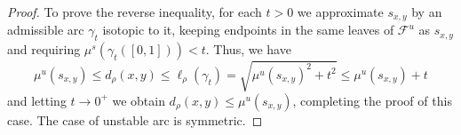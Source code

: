 \documentclass[10pt,a4paper]{amsart}
\newcommand{\mc}{\mathcal}
\begin{document}
\begin{proof}
To prove the reverse inequality, for each $t>0$
we approximate $s_{x,y}$ by an admissible arc $\gamma_t$ isotopic to it, keeping endpoints in the same leaves of $\mc{F}^u$ as $s_{x,y}$ and requiring $\mu^s(\gamma_t([0,1]))<t$.
Thus, we have 
$$
\mu^u(s_{x,y})\leq d_\rho(x,y)\leq \ell_{\rho}(\gamma_t)=\sqrt{\mu^u(s_{x,y})^2+t^2}\leq \mu^u(s_{x,y})+t
$$
and letting $t\to0^+$ we obtain $d_\rho(x,y)\leq\mu^u(s_{x,y})$, completing the proof of this case. The case of unstable arc is symmetric.
\end{proof}
\end{document}
